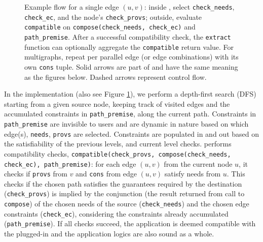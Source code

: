 \begin{figure}
\begin{tikzpicture}
\end{tikzpicture}
        \caption{Example flow for a single edge $(u,v)$: inside \sysgraph, select \texttt{check\_needs}, \texttt{check\_ec}, and the node’s \texttt{check\_provs}; outside, evaluate \texttt{compatible} on \texttt{compose(check\_needs, check\_ec)} and \texttt{path\_premise}. After a successful compatibility check, the \texttt{extract} function can optionally aggregate the \texttt{compatible} return value. For multigraphs, repeat per parallel edge (or edge combinations) with its own \texttt{cons} tuple. Solid arrows are part of \sysgraph and have the same meaning as the figures below. Dashed arrows represent control flow.}
\label{fig:skel}
\end{figure}


In the implementation (also see Figure \ref{fig:skel}), we perform a depth-first search (DFS) starting from a
given source node, keeping track of visited edges and the accumulated
constraints in \texttt{path\_premise}, along the current path.
Constraints in \texttt{path\_premise} are invisible to users and are dynamic in nature based on which
edge(s), \texttt{needs}, \texttt{provs} are selected. Constraints are populated in and out
based on the satisfiability of the previous levels, and current level checks.
\sysname{} performs compatibility checks, \texttt{compatible(check\_provs,
compose(check\_needs, check\_ec), path\_premise)}:
for each edge $(u, v)$ from the current node $u$, it checks if \texttt{provs} from $v$
and \texttt{cons} from edge $(u, v)$ satisfy needs from $u$.
This checks if the chosen path satisfies the guarantees required by the destination
(\texttt{check\_provs}) is
implied by the conjunction (the result returned from call to \texttt{compose}) of the chosen needs of the
source (\texttt{check\_needs}) and the chosen edge constraints
(\texttt{check\_ec}),
considering the constraints already accumulated (\texttt{path\_premise}).
If all checks succeed, the application is deemed compatible
with the plugged-in \sysmods{} and the application logics are also
sound as a whole.


